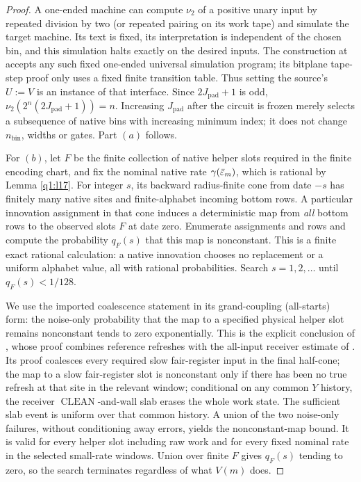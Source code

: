 \begin{proof}
A one-ended machine can compute \(\nu_{2}\) of a positive unary input by repeated division by two (or repeated pairing on its work tape) and simulate the target machine. Its text is fixed, its interpretation is independent of the chosen bin, and this simulation halts exactly on the desired inputs. The construction at \cite[Lemma~\ref*{cl:lem:locking}]{DMNoise1D2026} accepts any such fixed one-ended universal simulation program; its bitplane tape-step proof only uses a fixed finite transition table. Thus setting the source's \(U:=V\) is an instance of that interface. Since \(2J_{\mathrm{pad}}+1\) is odd, \(\nu_{2}(2^{n}(2J_{\mathrm{pad}}+1))=n\). Increasing \(J_{\mathrm{pad}}\) after the circuit is frozen merely selects a subsequence of native bins with increasing minimum index; it does not change \(n_{\mathrm{bin}}\), widths or gates. Part \((a)\) follows.

For \((b)\), let \(F\) be the finite collection of native helper slots required in the finite encoding chart, and fix the nominal native rate \(\gamma(\bar{\varepsilon}_{m})\), which is rational by Lemma \ref{q1:l17}. For integer \(s\), its backward radius-finite cone from date \(-s\) has finitely many native sites and finite-alphabet incoming bottom rows. A particular innovation assignment in that cone induces a deterministic map from \emph{all} bottom rows to the observed slots \(F\) at date zero. Enumerate assignments and rows and compute the probability \(q_{F}(s)\) that this map is nonconstant. This is a finite exact rational calculation: a native innovation chooses no replacement or a uniform alphabet value, all with rational probabilities. Search \(s=1,2,\dots\) until \(q_{F}(s)<1/128\).

We use the imported coalescence statement in its grand-coupling (all-starts) form: the noise-only probability that the map to a specified physical helper slot remains nonconstant tends to zero exponentially. This is the explicit conclusion of
\cite[Lemma~\ref*{cl:lem:stripes}]{DMNoise1D2026}, whose proof combines
reference refreshes with the all-input receiver estimate of
\cite[Lemma~\ref*{cl:lem:receiver-mixing}]{DMNoise1D2026}. Its proof coalesces every required slow fair-register input in the final half-cone; the map to a slow fair-register slot is nonconstant only if there has been no true refresh at that site in the relevant window; conditional on any common \(Y\) history, the receiver \(\operatorname{CLEAN}\)-and-wall slab erases the whole work state. The sufficient slab event is uniform over that common history. A union of the two noise-only failures, without conditioning away errors, yields the nonconstant-map bound. It is valid for every helper slot including raw work and for every fixed nominal rate in the selected small-rate windows. Union over finite \(F\) gives \(q_{F}(s)\) tending to zero, so the search terminates regardless of what \(V(m)\) does.


\end{proof}
